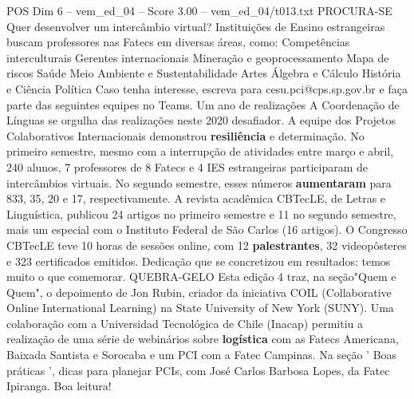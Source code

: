 \begin{textsample}{POS Dim 6 – vem\_ed\_04 – Score 3.00 – vem\_ed\_04/t013.txt}  \label{ex:f6_pos_138}
PROCURA-SE Quer desenvolver um intercâmbio virtual?
Instituições de Ensino estrangeiras buscam professores nas Fatecs em diversas áreas, como: Competências interculturais Gerentes internacionais Mineração e geoprocessamento Mapa de riscos Saúde Meio Ambiente e Sustentabilidade Artes Álgebra e Cálculo História e Ciência Política Caso tenha interesse, escreva para cesu.pci@cps.sp.gov.br e faça parte das seguintes equipes no Teams.
Um ano de realizações A Coordenação de Línguas se orgulha das realizações neste 2020 desafiador.
A equipe dos Projetos Colaborativos Internacionais demonstrou \textbf{resiliência} e determinação.
No primeiro semestre, mesmo com a interrupção de atividades entre março e abril, 240 alunos, 7 professores de 8 Fatecs e 4 IES estrangeiras participaram de intercâmbios virtuais.
No segundo semestre, esses números \textbf{aumentaram} para 833, 35, 20 e 17, respectivamente.
A revista acadêmica CBTecLE, de Letras e Linguística, publicou 24 artigos no primeiro semestre e 11 no segundo semestre, mais um especial com o Instituto Federal de São Carlos (16 artigos).
O Congresso CBTecLE teve 10 horas de sessões online, com 12 \textbf{palestrantes}, 32 videopôsteres e 323 certificados emitidos.
Dedicação que se concretizou em resultados: temos muito o que comemorar.
QUEBRA-GELO Esta edição 4 traz, na seção"Quem e Quem", o depoimento de Jon Rubin, criador da iniciativa COIL (Collaborative Online International Learning) na State University of New York (SUNY).
Uma colaboração com a Universidad Tecnológica de Chile (Inacap) permitiu a realização de uma série de webinários sobre \textbf{logística} com as Fatecs Americana, Baixada Santista e Sorocaba e um PCI com a Fatec Campinas.
Na seção ' Boas práticas ', dicas para planejar PCIs, com José Carlos Barbosa Lopes, da Fatec Ipiranga.
Boa leitura!

\end{textsample}
